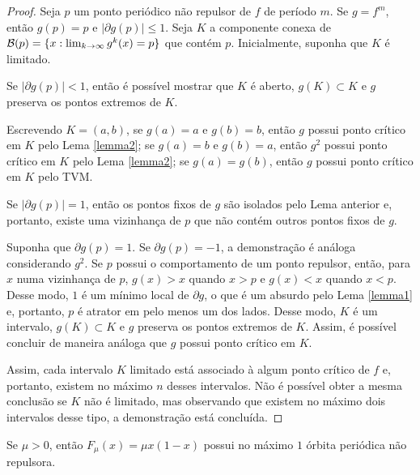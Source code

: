 \begin{proof}
Seja $p$ um ponto periódico não repulsor de $f$ de período $m$.
Se $g = f^m$, então $g(p) = p$ e $|\partial g(p)| \leq 1$.
Seja $K$ a componente conexa de $\mathcal{B}(p) = \lbrace x : \lim_{k \to \infty} g^k(x) = p \rbrace$ que contém $p$.
Inicialmente, suponha que $K$ é limitado.

Se $|\partial g(p)| < 1$, então é possível mostrar que $K$ é aberto, $g(K) \subset K$ e $g$ preserva os pontos extremos de $K$.

Escrevendo $K = (a, b)$, se $g(a) = a$ e $g(b) = b$, então $g$ possui ponto crítico em $K$ pelo Lema \ref{lemma2}; se $g(a) = b$ e $g(b) = a$, então $g^2$ possui ponto crítico em $K$ pelo Lema \ref{lemma2}; se $g(a) = g(b)$, então $g$ possui ponto crítico em $K$ pelo TVM.

Se $|\partial g(p)| = 1$, então os pontos fixos de $g$ são isolados pelo Lema anterior e, portanto, existe uma vizinhança de $p$ que não contém outros pontos fixos de $g$.

Suponha que $\partial g(p) = 1$.
Se $\partial g(p) = -1$, a demonstração é análoga considerando $g^2$.
Se $p$ possui o comportamento de um ponto repulsor, então, para $x$ numa vizinhança de $p$, $g(x) > x$ quando $x > p$ e $g(x) < x$ quando $x < p$.
Desse modo, $1$ é um mínimo local de $\partial g$, o que é um absurdo pelo Lema \ref{lemma1} e, portanto, $p$ é atrator em pelo menos um dos lados.
Desse modo, $K$ é um intervalo, $g(K) \subset K$ e $g$ preserva os pontos extremos de $K$.
Assim, é possível concluir de maneira análoga que $g$ possui ponto crítico em $K$.

Assim, cada intervalo $K$ limitado está associado à algum ponto crítico de $f$ e, portanto, existem no máximo $n$ desses intervalos.
Não é possível obter a mesma conclusão se $K$ não é limitado, mas observando que existem no máximo dois intervalos desse tipo, a demonstração está concluída.
\end{proof}

\begin{corollary}
Se $\mu > 0$, então $F_\mu(x) = \mu x(1-x)$ possui no máximo $1$ órbita periódica não repulsora.
\end{corollary}
